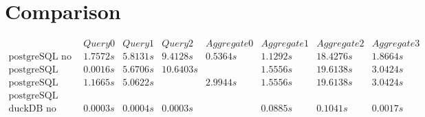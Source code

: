 \section{Comparison}\label{sec:comparison}

$\begin{matrix}
                                                    & Query 0 & Query 1 & Query 2  & Aggregate 0 & Aggregate 1 & Aggregate 2 & Aggregate 3 \\
        \hline
        \text{postgreSQL no opti}                   & 1.7572s & 5.8131s & 9.4128s  & 0.5364s     & 1.1292s     & 18.4276s    & 1.8664s     \\
        \text{postgreSQL index on medallion}        & 0.0016s & 5.6706s & 10.6403s &             & 1.5556s     & 19.6138s    & 3.0424s     \\
        \text{postgreSQL index on passenger\_count} & 1.1665s & 5.0622s &          & 2.9944s     & 1.5556s     & 19.6138s    & 3.0424s     \\
        \text{postgreSQL index + cluster}           &         &         &          &             &             &             &             \\
        \text{duckDB no opti}                       & 0.0003s & 0.0004s & 0.0003s  &             & 0.0885s     & 0.1041s     & 0.0017s
    \end{matrix}$


